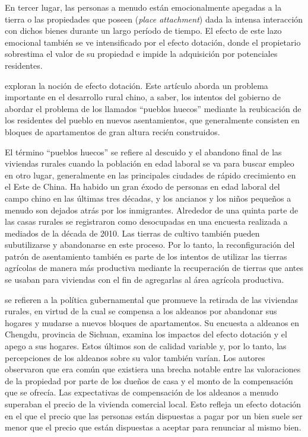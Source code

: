 \documentclass[cm,linguex]{glossa}
\begin{document}
En tercer lugar, las personas a menudo están emocionalmente apegadas a
la tierra o las propiedades que poseen (\emph{place attachment}) dada la
intensa interacción con dichos bienes durante un largo período de
tiempo. El efecto de este lazo emocional también se ve intensificado por
el efecto dotación, donde el propietario sobrestima el valor de su
propiedad e impide la adquisición por potenciales residentes.

\citet{Liu} exploran la noción de efecto dotación. Este artículo aborda
un problema importante en el desarrollo rural chino, a saber, los
intentos del gobierno de abordar el problema de los llamados ``pueblos
huecos'' mediante la reubicación de los residentes del pueblo en nuevos
asentamientos, que generalmente consisten en bloques de apartamentos de
gran altura recién construidos.

El término ``pueblos huecos'' se refiere al descuido y el abandono final
de las viviendas rurales cuando la población en edad laboral se va para
buscar empleo en otro lugar, generalmente en las principales ciudades de
rápido crecimiento en el Este de China. Ha habido un gran éxodo de
personas en edad laboral del campo chino en las últimas tres décadas, y
los ancianos y los niños pequeños a menudo son dejados atrás por los
inmigrantes. Alrededor de una quinta parte de las casas rurales se
registraron como desocupadas en una encuesta realizada a mediados de la
década de 2010. Las tierras de cultivo también pueden subutilizarse y
abandonarse en este proceso. Por lo tanto, la reconfiguración del patrón
de asentamiento también es parte de los intentos de utilizar las tierras
agrícolas de manera más productiva mediante la recuperación de tierras
que antes se usaban para viviendas con el fin de agregarlas al área
agrícola productiva.

\citet{Liu} se refieren a la política gubernamental que promueve la
retirada de las viviendas rurales, en virtud de la cual se compensa a
los aldeanos por abandonar sus hogares y mudarse a nuevos bloques de
apartamentos. Su encuesta a aldeanos en Chengdu, provincia de Sichuan,
examina los impactos del efecto dotación y el apego a sus hogares. Estos
últimos son de calidad variable y, por lo tanto, las percepciones de los
aldeanos sobre su valor también varían. Los autores observaron que era
común que existiera una brecha notable entre las valoraciones de la
propiedad por parte de los dueños de casa y el monto de la compensación
que se ofrecía. Las expectativas de compensación de los aldeanos a
menudo superaban el precio de la vivienda comercial local. Esto refleja
un efecto dotación en el que el precio que las personas están dispuestas
a pagar por un bien suele ser menor que el precio que están dispuestas a
aceptar para renunciar al mismo bien.
\end{document}
